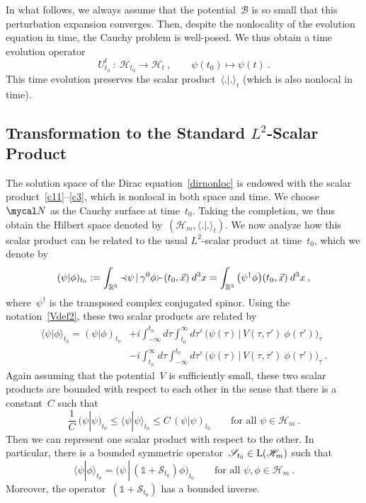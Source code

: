 \documentclass[reqno,11pt]{amsart}
\numberwithin{equation}{section}
\newcommand{\beq}{\begin{equation}}
\newcommand{\eeq}{\end{equation}}
\newcommand{\la}{\langle}
\newcommand{\ra}{\rangle}
\newcommand{\Sl}{\mbox{$\prec \!\!$ \nolinebreak}}
\newcommand{\Sr}{\mbox{\nolinebreak $\succ$}}
\newcommand{\R}{\mathbb{R}}
\newcommand{\1}{\mathds{1}}
\newcommand{\B}{{\mathscr{B}}}
\renewcommand{\H}{\mathscr{H}}
\newcommand{\Lin}{\text{\rm{L}}}
\newcommand{\Sig}{\mathscr{S}}
\newcommand{\scrN}{\mycal N}
\begin{document}
In what follows, we always assume that the potential~$\B$ is so small that this perturbation expansion
converges. Then, despite the nonlocality of the evolution equation in time, the Cauchy problem is well-posed.
We thus obtain a time evolution operator
\[ U^t_{t_0} \::\: \H_{t_0} \rightarrow \H_t \:, \qquad \psi(t_0) \mapsto \psi(t) \:. \]
This time evolution preserves the scalar product~$\la .|. \ra_t$ (which is also nonlocal in time).

\subsection{Transformation to the Standard $L^2$-Scalar Product} \label{sectransform}
The solution space of the Dirac equation~\eqref{dirnonloc} is endowed with the scalar
product~\eqref{c11}--\eqref{c3}, which is nonlocal in both space and time.
We choose~$\scrN$ as the Cauchy surface at time~$t_0$.
Taking the completion, we thus obtain the Hilbert space denoted by~$(\H_m, \la.|. \ra_t)$.
We now analyze how this scalar product can be related to the usual $L^2$-scalar product at time~$t_0$,
which we denote by
\[ ( \psi | \phi )_{t_0} := \int_{\R^3} \Sl \psi \,|\, \gamma^0 \phi \Sr(t_0, \vec{x})\: d^3x
= \int_{\R^3} \big( \psi^\dagger \phi \big)(t_0, \vec{x})\: d^3x \:, \]
where~$\psi^\dagger$ is the transposed complex conjugated spinor.
Using the notation~\eqref{Vdef2}, these two scalar products are related by
\beq \label{scalcomp}
\begin{split}
\la \psi | \phi \ra_{t_0} = ( \psi | \phi)_{t_0} &+i \int_{-\infty}^{t_0} d\tau \int_{t_0}^\infty d\tau' \:
\big( \psi(\tau) \,|\, V(\tau,\tau') \:\phi(\tau') \big)_\tau \\
&-i \int_{t_0}^\infty d\tau \int_{-\infty}^{t_0} d\tau' \:
\big( \psi(\tau) \,|\, V(\tau,\tau') \:\phi(\tau') \big)_\tau \:.
\end{split}
\eeq
Again assuming that the potential~$V$ is sufficiently small, these two scalar products are
bounded with respect to each other in the sense that there is a constant~$C$ such that
\[ \frac{1}{C}\: ( \psi | \psi)_{t_0} \leq \la \psi | \psi \ra_{t_0} \leq C\, ( \psi | \psi)_{t_0} \qquad \text{for all~$\psi \in \H_m$}\:. \]
Then we can represent one scalar product with respect to the other. In particular, there is a
bounded symmetric operator~$\Sig_{t_0} \in \Lin(\H_m)$ such that
\beq \label{Sigdef}
\la \psi | \phi \ra_{t_0} = \big( \psi \,|\, (\1+\Sig_{t_0}) \phi \big)_{t_0} \qquad \text{for all~$\psi, \phi \in \H_m$} \:.
\eeq
Moreover, the operator~$(\1+\Sig_{t_0})$ has a bounded inverse.
\end{document}
